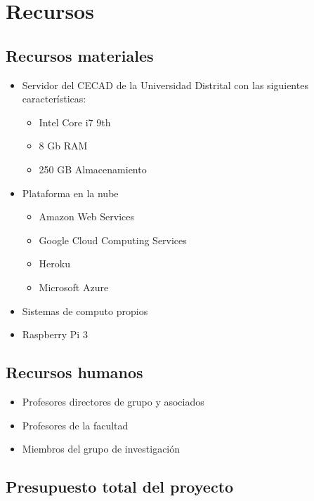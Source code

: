 \chapter{Recursos}

\section{Recursos materiales}
\begin{itemize}
    \item Servidor del CECAD de la Universidad Distrital con las siguientes características:
    \begin{itemize}
        \item Intel Core i7 9th
        \item 8 Gb RAM
        \item 250 GB Almacenamiento
    \end{itemize}
    \item Plataforma en la nube
        \begin{itemize}
        \item Amazon Web Services
        \item Google Cloud Computing Services
        \item Heroku
        \item Microsoft Azure
    \end{itemize}
    \item Sistemas de computo propios
    \item Raspberry Pi 3
\end{itemize}
\section{Recursos humanos}
\begin{itemize}
    \item Profesores directores de grupo y asociados
    \item Profesores de la facultad
    \item Miembros del grupo de investigación
\end{itemize}
\section{Presupuesto total del proyecto}

